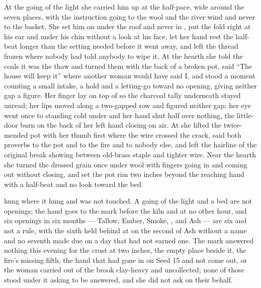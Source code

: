 \scenebreak

At the going of the light she carried him up at the half-pace, wide around the seven places, with the instruction going to the wool and the river wind and never to the basket. She set him on  under the roof and never in , put the fold right at his ear and under his chin without a look at his face, let her hand rest the half-beat longer than the setting needed before it went away, and left the thread frozen where nobody had told anybody to wipe it. At the hearth she told the coals it was the thaw and turned them with the back of a broken pot, said “The house will keep it” where another woman would have said I, and stood a moment counting a small intake, a hold and a letting-go toward no opening, giving neither gap a figure. Her finger lay on top of  so the charcoal tally underneath stayed unread; her lips moved along a two-gapped row and figured neither gap; her eye went once to  standing cold under  and her hand shut half over nothing, the little-door burn on the back of her left hand closing on air. At  she lifted the twice-mended pot with her thumb first where the wire crossed the crack, said both proverbs to the pot and to the fire and to nobody else, and left the hairline of the original break showing between old-brass staple and tighter wire. Near the hearth she turned the dressed grain once under wool with fingers going in and coming out without closing, and set the pot rim two inches beyond the reaching hand with a half-beat and no look toward the bed.

 hung where it hung and was not touched. A going of the light and a bed are not openings; the hand goes to the mark before the kiln and at no other hour, and six openings in six months --- Tallow, Ember, Smoke, ,  and Ash --- are six and not a rule, with the sixth held behind at  on the second of Ash without a name and no seventh made due on a day that had not earned one. The mark answered nothing this evening for the crust at two inches, the empty place beside it, the fire’s missing fifth, the hand that had gone in on Seed 15 and not come out, or the woman carried out of the brook clay-heavy and uncollected; none of those stood under it asking to be answered, and she did not ask on their behalf.

